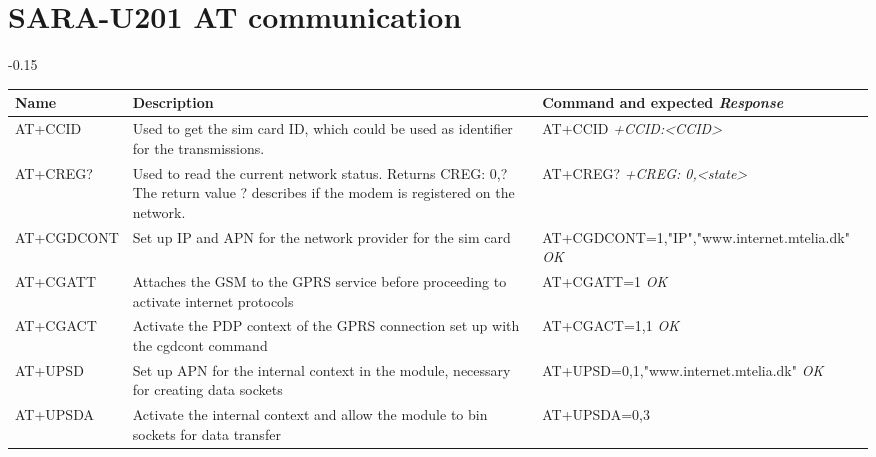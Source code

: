 \appendix
\setlength{\beforechapskip}{-15ex}

\chapter{SARA-U201 AT communication}
\label{app:sarau201}
\begin{table}[H]
	\addtolength{\leftskip} {-0.15\textwidth}
	\addtolength{\rightskip}{-0.15\textwidth}
	\begin{tabularx}{1.3\textwidth}{p{2cm} X X}
		\toprule
		Name & Description & Command and expected \textit{Response} \\
		\midrule
		AT+CCID & Used to get the sim card ID, which could be used as identifier for the transmissions. & AT+CCID \newline \newline
		\textit{+CCID:<CCID>} \\ 
		AT+CREG? & Used to read the current network status. Returns CREG: 0,? \newline
		The return value ? describes if the modem is registered on the network. & AT+CREG? \newline \newline
		\textit{+CREG: 0,<state>} \\
		AT+CGDCONT & Set up IP and APN for the network provider for the sim card & AT+CGDCONT=1,"IP","www.internet.mtelia.dk" \newline \newline
		\textit{OK} \\
		AT+CGATT & Attaches the GSM to the GPRS service before proceeding to activate internet protocols & AT+CGATT=1 \newline \newline
		\textit{OK} \\
		AT+CGACT & Activate the PDP context of the GPRS connection set up with the cgdcont command & AT+CGACT=1,1 \newline \newline
		\textit{OK} \\
		AT+UPSD & Set up APN for the internal context in the module, necessary for creating data sockets& AT+UPSD=0,1,"www.internet.mtelia.dk" \newline \newline
		\textit{OK} \\
		AT+UPSDA & Activate the internal context and allow the module to bin sockets for data transfer & AT+UPSDA=0,3\newline \newline

\end{tabularx}
\end{table}
